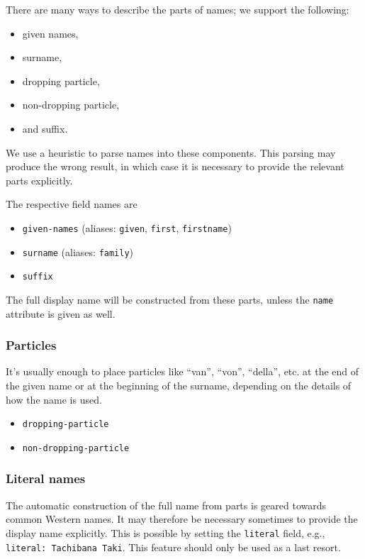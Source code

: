 \documentclass[10pt,a4paper,onecolumn]{article}
\providecommand{\tightlist}{%
  \setlength{\itemsep}{0pt}\setlength{\parskip}{0pt}}
\begin{document}
There are many ways to describe the parts of names; we support the
following:

\begin{itemize}
\tightlist
\item
  given names,
\item
  surname,
\item
  dropping particle,
\item
  non-dropping particle,
\item
  and suffix.
\end{itemize}

We use a heuristic to parse names into these components. This parsing
may produce the wrong result, in which case it is necessary to provide
the relevant parts explicitly.

The respective field names are

\begin{itemize}
\tightlist
\item
  \texttt{given-names} (aliases: \texttt{given}, \texttt{first},
  \texttt{firstname})
\item
  \texttt{surname} (aliases: \texttt{family})
\item
  \texttt{suffix}
\end{itemize}

The full display name will be constructed from these parts, unless the
\texttt{name} attribute is given as well.

\subsubsection{Particles}\label{particles}

It's usually enough to place particles like ``van'', ``von'', ``della'',
etc. at the end of the given name or at the beginning of the surname,
depending on the details of how the name is used.

\begin{itemize}
\tightlist
\item
  \texttt{dropping-particle}
\item
  \texttt{non-dropping-particle}
\end{itemize}

\subsubsection{Literal names}\label{literal-names}

The automatic construction of the full name from parts is geared towards
common Western names. It may therefore be necessary sometimes to provide
the display name explicitly. This is possible by setting the
\texttt{literal} field, e.g., \texttt{literal:\ Tachibana\ Taki}. This
feature should only be used as a last resort.
\end{document}
